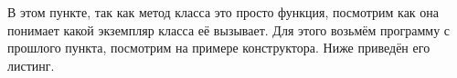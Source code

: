 \documentclass[a4paper,12pt]{article}
\begin{document}
В этом пункте, так как метод класса это просто функция, посмотрим как она понимает какой экземпляр класса её вызывает. Для этого возьмём программу с прошлого пункта, посмотрим на примере конструктора. Ниже приведён его листинг.
\begin{figure}[H]\label{fig: Листинг конструктора и его вызова}
\end{figure}
\end{document}
